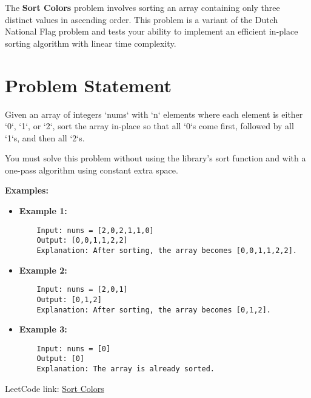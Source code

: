 
\label{problem:sort_colors}

The \textbf{Sort Colors} problem involves sorting an array containing only three distinct values in ascending order. This problem is a variant of the Dutch National Flag problem and tests your ability to implement an efficient in-place sorting algorithm with linear time complexity.

\section*{Problem Statement}
Given an array of integers `nums` with `n` elements where each element is either `0`, `1`, or `2`, sort the array in-place so that all `0`s come first, followed by all `1`s, and then all `2`s.

You must solve this problem without using the library's sort function and with a one-pass algorithm using constant extra space.

\textbf{Examples:}

\begin{itemize}
	\item \textbf{Example 1:}
	\begin{verbatim}
	Input: nums = [2,0,2,1,1,0]
	Output: [0,0,1,1,2,2]
	Explanation: After sorting, the array becomes [0,0,1,1,2,2].
	\end{verbatim}

	\item \textbf{Example 2:}
	\begin{verbatim}
	Input: nums = [2,0,1]
	Output: [0,1,2]
	Explanation: After sorting, the array becomes [0,1,2].
	\end{verbatim}

	\item \textbf{Example 3:}
	\begin{verbatim}
	Input: nums = [0]
	Output: [0]
	Explanation: The array is already sorted.
	\end{verbatim}
\end{itemize}

LeetCode link: \href{https://leetcode.com/problems/sort-colors/}{Sort Colors}



